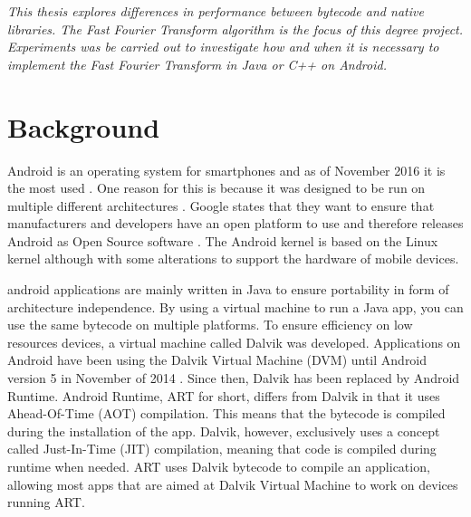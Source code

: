 
\textit{This thesis explores differences in performance between bytecode and native libraries. The Fast Fourier Transform algorithm is the focus of this degree project. Experiments was be carried out to investigate how and when it is necessary to implement the Fast Fourier Transform in Java or C++ on Android.}


\section{Background}
Android is an operating system for smartphones and as of November 2016 it is the most used \cite{android:os:popularity}. One reason for this is because it was designed to be run on multiple different architectures \cite{android:os:devices}. Google states that they want to ensure that manufacturers and developers have an open platform to use and therefore releases Android as Open Source software \cite{android:os:opensource}. The Android kernel is based on the Linux kernel although with some alterations to support the hardware of mobile devices.


\gls{android} applications are mainly written in Java to ensure portability in form of architecture independence. By using a virtual machine to run a Java app, you can use the same bytecode on multiple platforms. To ensure efficiency on low resources devices, a virtual machine called Dalvik was developed. Applications on Android have been using the Dalvik Virtual Machine (DVM) until Android version 5 \cite{android:dalvik} in November of 2014 \cite{android:dalvik:release}. Since then, Dalvik has been replaced by Android Runtime. Android Runtime, ART for short, differs from Dalvik in that it uses Ahead-Of-Time (AOT) compilation. This means that the bytecode is compiled during the installation of the app. Dalvik, however, exclusively uses a concept called Just-In-Time (JIT) compilation, meaning that code is compiled during runtime when needed. ART uses Dalvik bytecode to compile an application, allowing most apps that are aimed at Dalvik Virtual Machine to work on devices running ART.

